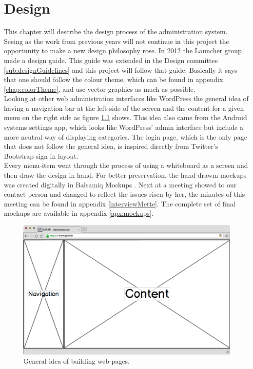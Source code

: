\chapter{Design}
\label{chp:design}
This chapter will describe the design process of the administration system.\\
Seeing as the work from previous years will not continue in this project the opportunity to make a new design philosophy rose. 
In 2012 the Launcher group made a design guide. This guide was extended in the Design committee \ref{sub:designGuidelines} and this project will follow that guide. Basically it says that one should follow the colour theme, which can be found in appendix \ref{chap:colorTheme}, and use vector graphics as much as possible. \\
Looking at other web administration interfaces like WordPress \citep{wordpress} the general idea of having a navigation bar at the left side of the screen and the content for a given menu on the right side as figure \ref{fig:ideaWep} shows. This idea also came from the Android systems settings app, which looks like WordPress' admin interface but include a more neutral way of displaying categories. The login page, which is the only page that does not follow the general idea, is inspired directly from Twitter's Bootstrap \citep{bootstrap} sign in layout.\\ 
Every menu-item went through the process of using a whiteboard as a screen and then draw the design in hand. For better preservation, the hand-drawm mockups was  created digitally in Balsamiq Mockups \citep{balsamiq}. Next at a meeting showed to our contact person and changed to reflect the issues risen by her, the minutes of this meeting can be found in appendix \ref{interviewMette}. The complete set of final mockups are available in appendix \ref{apx:mockups}.\\

\begin{figure}[!h]
\centering
\includegraphics[width=1\textwidth]{images/mockup/displayMode.png}
\caption{General idea of building web-pages.}
\label{fig:ideaWep}
\end{figure}


